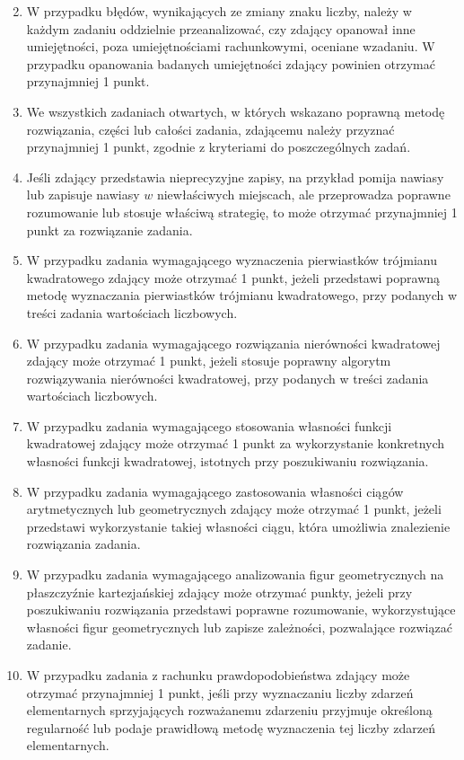 \documentclass[10pt]{article}
\begin{document}
\begin{enumerate}
  \setcounter{enumi}{1}
  \item W przypadku błędów, wynikających ze zmiany znaku liczby, należy w każdym zadaniu oddzielnie przeanalizować, czy zdający opanował inne umiejętności, poza umiejętnościami rachunkowymi, oceniane wzadaniu. W przypadku opanowania badanych umiejętności zdający powinien otrzymać przynajmniej 1 punkt.
  \item We wszystkich zadaniach otwartych, w których wskazano poprawną metodę rozwiązania, części lub całości zadania, zdającemu należy przyznać przynajmniej 1 punkt, zgodnie z kryteriami do poszczególnych zadań.
  \item Jeśli zdający przedstawia nieprecyzyjne zapisy, na przykład pomija nawiasy lub zapisuje nawiasy $w$ niewłaściwych miejscach, ale przeprowadza poprawne rozumowanie lub stosuje właściwą strategię, to może otrzymać przynajmniej 1 punkt za rozwiązanie zadania.
  \item W przypadku zadania wymagającego wyznaczenia pierwiastków trójmianu kwadratowego zdający może otrzymać 1 punkt, jeżeli przedstawi poprawną metodę wyznaczania pierwiastków trójmianu kwadratowego, przy podanych w treści zadania wartościach liczbowych.
  \item W przypadku zadania wymagającego rozwiązania nierówności kwadratowej zdający może otrzymać 1 punkt, jeżeli stosuje poprawny algorytm rozwiązywania nierówności kwadratowej, przy podanych w treści zadania wartościach liczbowych.
  \item W przypadku zadania wymagającego stosowania własności funkcji kwadratowej zdający może otrzymać 1 punkt za wykorzystanie konkretnych własności funkcji kwadratowej, istotnych przy poszukiwaniu rozwiązania.
  \item W przypadku zadania wymagającego zastosowania własności ciągów arytmetycznych lub geometrycznych zdający może otrzymać 1 punkt, jeżeli przedstawi wykorzystanie takiej własności ciągu, która umożliwia znalezienie rozwiązania zadania.
  \item W przypadku zadania wymagającego analizowania figur geometrycznych na płaszczyźnie kartezjańskiej zdający może otrzymać punkty, jeżeli przy poszukiwaniu rozwiązania przedstawi poprawne rozumowanie, wykorzystujące własności figur geometrycznych lub zapisze zależności, pozwalające rozwiązać zadanie.
  \item W przypadku zadania z rachunku prawdopodobieństwa zdający może otrzymać przynajmniej 1 punkt, jeśli przy wyznaczaniu liczby zdarzeń elementarnych sprzyjających rozważanemu zdarzeniu przyjmuje określoną regularność lub podaje prawidłową metodę wyznaczenia tej liczby zdarzeń elementarnych.

\end{enumerate}
\end{document}

